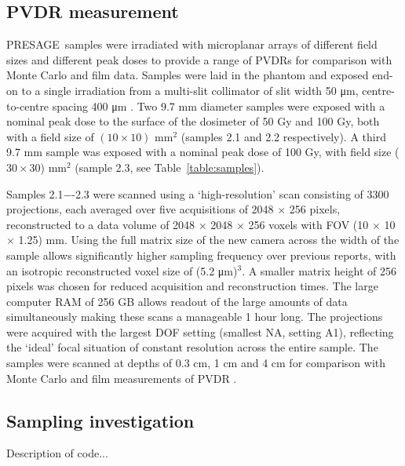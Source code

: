 	\subsection{PVDR measurement}
	PRESAGE\textregistered \ samples were irradiated with microplanar arrays of different field sizes and different peak doses to provide a range of PVDRs for comparison with Monte Carlo and film data. Samples were laid in the phantom and exposed end-on to a single irradiation from a multi-slit collimator of slit width 50 \si{\um}, centre-to-centre spacing 400 \si{\um} \cite{brauer2009new}. Two 9.7 mm diameter samples were exposed with a nominal peak dose to the surface of the dosimeter of 50 Gy and 100 Gy, both with a field size of $(10 \times 10)$ mm$^2$ (samples 2.1 and 2.2 respectively). A third 9.7 mm sample was exposed with a nominal peak dose of 100 Gy, with field size ($30 \times 30$) mm$^2$ (sample 2.3, see Table~\ref{table:samples}). 
	
	Samples 2.1−-2.3 were scanned using a `high-resolution' scan consisting of 3300 projections, each averaged over five acquisitions of 2048 $\times$ 256 pixels, reconstructed to a data volume of 2048 $\times$ 2048 $\times$ 256 voxels with FOV (10 $\times$ 10 $\times$ 1.25) mm. Using the full matrix size of the new camera across the width of the sample allows significantly higher sampling frequency over previous reports, with an isotropic reconstructed voxel size of (5.2 \si{\um})$^3$. A smaller matrix height of 256 pixels was chosen for reduced acquisition and reconstruction times. The large computer RAM of 256 GB allows readout of the large amounts of data simultaneously making these scans a manageable 1 hour long. The projections were acquired with the largest DOF setting (smallest NA, setting A1), reflecting the `ideal' focal situation of constant resolution across the entire sample. The samples were scanned at depths of 0.3 cm, 1 cm and 4 cm for comparison with Monte Carlo and film measurements of PVDR \cite{martinez-roviradevelopment2012}. 
	
	
	\subsection{Sampling investigation}
	Description of code...

	
